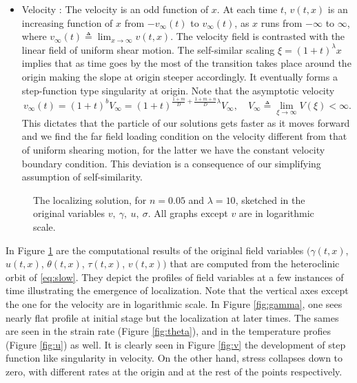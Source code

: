 \documentclass[a4paper,11pt]{article}
\def\red{\color{red}}
\theoremstyle{remark}
\begin{document}
\begin{itemize}
\item Velocity : The velocity is an odd function of $x$. At each time $t$, $v(t,x)$ is an increasing function of $x$ from $-v_\infty(t)$ to $v_\infty(t)$, as $x$ runs from $-\infty$ to $\infty$, where $v_\infty(t)\triangleq \lim_{x \rightarrow \infty} v(t,x)$. The velocity field is contrasted with the linear field of uniform shear motion. The self-similar scaling  $\xi=(1+t)^\lambda x$ implies that as time goes by the most of the transition takes place around the origin making the slope at origin steeper accordingly. It eventually forms a step-function type singularity at origin. Note that the asymptotic velocity $$v_\infty(t)=(1+t)^{b}V_\infty = (1+t)^{\frac{1+m}{D} + \frac{1+m+n}{D}\lambda}V_\infty, \quad V_\infty \triangleq \lim_{\xi \rightarrow \infty} V(\xi) <\infty.$$
This dictates that the particle of our solutions gets faster as it moves forward and we find the far field loading condition on the velocity different from that of uniform shearing motion, for the latter we have the constant velocity boundary condition. This deviation is a consequence of our simplifying assumption of self-similarity.
\end{itemize}

\begin{figure}[ht]
 \centering
 \subfigure[{\red temperature ($\theta$)}]{
 \texttt{[image: strain\_rate\_log]} \label{fig:theta}
 }
\caption{The localizing solution, for $n=0.05$ and $\lambda =10$, sketched in the original variables $v,\ \gamma, \ u, \ \sigma$.
All graphs except $v$ are in logarithmic scale.} \label{fig:computation}
\end{figure}

In Figure \ref{fig:computation} are the computational results of the original field variables $\big(\gamma(t,x)$, $u(t,x)$, $\theta(t,x)$, $\tau(t,x)$, $v(t,x)\big)$ that are computed from the heteroclinic orbit of \eqref{eq:slow}. They depict the profiles of field variables at a few instances of time illustrating the emergence of localization. Note that the vertical axes except the one for the velocity are in logarithmic scale. In Figure \ref{fig:gamma}, one sees nearly flat profile at initial stage but the localization at later times.  The sames are seen in the strain rate (Figure \ref{fig:theta}), and in the temperature profies (Figure \ref{fig:u}) as well. It is clearly seen in Figure \ref{fig:v} the development of step function like singularity in velocity. On the other hand, stress collapses down to zero, with different rates at the origin and at the rest of the points respectively.
\end{document}
